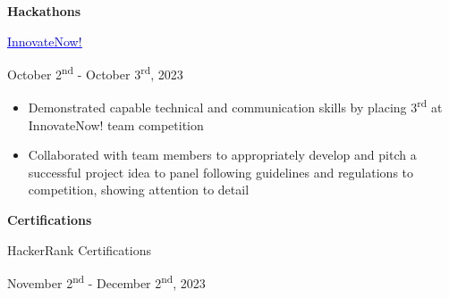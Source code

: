 \documentclass[a4paper,11pt]{article}
\begin{document}
 \begin{minipage}{.65\linewidth}
   \textbf{Hackathons} 
\end{minipage}
 \begin{minipage}{.65\linewidth}
    \href{https://github.com/JeremyFriesenGitHub/InnovateNow}{\textcolor{blue}{\uline{InnovateNow!}}}
\end{minipage}
\begin{minipage}{.34\linewidth}
    \flushright
    October 2\textsuperscript{nd} - October 3\textsuperscript{rd}, 2023
\end{minipage}
\begin{minipage}{\linewidth}
\vspace{10pt}
\begin{itemize}
    \item Demonstrated capable technical and communication skills by placing 3\textsuperscript{rd} at InnovateNow! team competition
    \item Collaborated with team members to appropriately develop and pitch a successful project idea to panel following guidelines and regulations to competition, showing attention to detail
\end{itemize}
\vspace{1pt}
\end{minipage}

\begin{minipage}{.65\linewidth}
     \textbf{Certifications}
 \end{minipage}
  \begin{minipage}{.65\linewidth}
     HackerRank Certifications
 \end{minipage}
 \begin{minipage}{.34\linewidth}
    \raggedleft
    November 2\textsuperscript{nd} - December 2\textsuperscript{nd}, 2023
\end{minipage}
\end{document}

